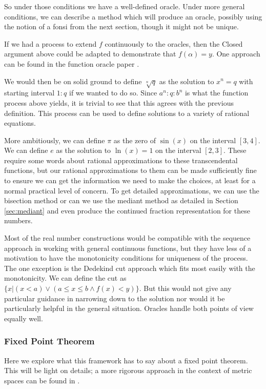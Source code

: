 \documentclass[12pt]{article}
\begin{document}
So under those conditions we have a well-defined oracle. Under more general conditions, we can describe a method which will produce an oracle, possibly using the notion of a fonsi from the next section, though it might not be unique.  

If we had a process to extend $f$ continuously to the oracles, then the Closed argument above could be adapted to demonstrate that $f(\alpha)=y$. One approach can be found in the function oracle  paper \cite{taylor23funora}.

We would then be on solid ground to define $\sqrt[n]{q}$ as the solution to $x^n = q$ with starting interval $1:q$ if we wanted to do so. Since $a^n : q: b^n$ is what the function process above yields, it is trivial to see that this agrees with the previous definition. This process can be used to define solutions to a variety of rational equations. 

More ambitiously, we can define $\pi$ as the zero of $\sin(x)$ on the interval $[3,4]$. We can define $e$ as the solution to  $\ln(x)=1$ on the interval $[2,3]$. These require some words about rational approximations to these transcendental functions, but our rational approximations to them can be made sufficiently fine to ensure we can get the information we need to make the choices, at least for a normal practical level of concern.  To get detailed approximations, we can use the bisection method or can we use the mediant method as detailed in Section \ref{sec:mediant} and even produce the continued fraction representation for these numbers.
 
Most of the real number constructions would be compatible with the sequence approach in working with general continuous functions, but they have less of a motivation to have the monotonicity conditions for uniqueness of the process. The one exception is the Dedekind cut approach which fits most easily with the monotonicity. We can define the cut as $\{x| (x<a) \vee (a \leq x \leq b \wedge f(x) < y) \}$. But this would not give any particular guidance in narrowing down to the solution nor would it be particularly helpful in the general situation. Oracles handle both points of view equally well. 

\subsubsection{Fixed Point Theorem}

Here we explore what this framework has to say about a fixed point theorem. This will be light on details; a more rigorous approach in the context of metric spaces can be found in \cite{taylor23metric}.
\end{document}
